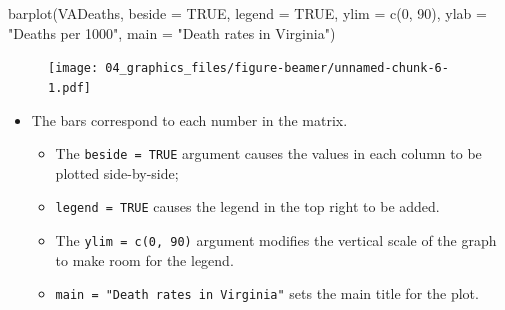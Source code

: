 \documentclass[
  9pt,
  a4paper,
  ignorenonframetext,
  notheorems]{beamer}
\newenvironment{Shaded}{\begin{snugshade}}{\end{snugshade}}
\newcommand{\AttributeTok}[1]{\textcolor[rgb]{0.40,0.45,0.13}{#1}}
\newcommand{\ConstantTok}[1]{\textcolor[rgb]{0.56,0.35,0.01}{#1}}
\newcommand{\DecValTok}[1]{\textcolor[rgb]{0.68,0.00,0.00}{#1}}
\newcommand{\FunctionTok}[1]{\textcolor[rgb]{0.28,0.35,0.67}{#1}}
\newcommand{\NormalTok}[1]{\textcolor[rgb]{0.00,0.23,0.31}{#1}}
\newcommand{\StringTok}[1]{\textcolor[rgb]{0.13,0.47,0.30}{#1}}
\providecommand{\tightlist}{%
  \setlength{\itemsep}{0pt}\setlength{\parskip}{0pt}}\usepackage{longtable,booktabs,array}
\begin{document}
\begin{frame}[fragile]
\begin{Shaded}
\begin{Highlighting}[]
\FunctionTok{barplot}\NormalTok{(VADeaths, }\AttributeTok{beside =} \ConstantTok{TRUE}\NormalTok{, }\AttributeTok{legend =} \ConstantTok{TRUE}\NormalTok{, }\AttributeTok{ylim =} \FunctionTok{c}\NormalTok{(}\DecValTok{0}\NormalTok{, }\DecValTok{90}\NormalTok{),}
        \AttributeTok{ylab =} \StringTok{"Deaths per 1000"}\NormalTok{,}
        \AttributeTok{main =} \StringTok{"Death rates in Virginia"}\NormalTok{)}
\end{Highlighting}
\end{Shaded}

\begin{figure}

{\centering \texttt{[image: 04\_graphics\_files/figure-beamer/unnamed-chunk-6-1.pdf]}

}

\end{figure}

\begin{itemize}
\tightlist
\item
  The bars correspond to each number in the matrix.

  \begin{itemize}
  \tightlist
  \item
    The \texttt{beside\ =\ TRUE} argument causes the values in each
    column to be plotted side-by-side;
  \item
    \texttt{legend\ =\ TRUE} causes the legend in the top right to be
    added.
  \item
    The \texttt{ylim\ =\ c(0,\ 90)} argument modifies the vertical scale
    of the graph to make room for the legend.
  \item
    \texttt{main\ =\ "Death\ rates\ in\ Virginia"} sets the main title
    for the plot.
  \end{itemize}
\end{itemize}
\end{frame}
\end{document}
